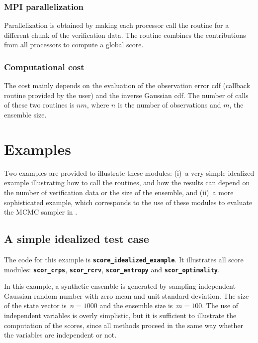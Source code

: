 \documentclass[11pt]{article}
\begin{document}
\subsubsection*{MPI parallelization}

Parallelization is obtained by making each processor call the routine
for a different chunk of the verification data.
The routine combines the contributions from all processors
to compute a global score.

\subsubsection*{Computational cost}

The cost mainly depends on the evaluation of the observation error cdf
(callback routine provided by the user) and the inverse Gaussian cdf.
The number of calls of these two routines is $n m$,
where $n$ is the number of observations and $m$, the ensemble size.

\clearpage

\section{Examples}

Two examples are provided to illustrate these modules:
(i)~a very simple idealized example illustrating how to call the routines,
and how the results can depend on the number of verification data or the size of the ensemble, and
(ii)~a more sophisticated example, which corresponds to the use of these modules
to evaluate the MCMC sampler in \citet{BRAN19}.

\subsection{A simple idealized test case}

The code for this example is {\tt\bf score\_idealized\_example}.
It illustrates all score modules: {\tt\bf scor\_crps}, {\tt\bf scor\_rcrv},
{\tt\bf scor\_entropy} and {\tt\bf scor\_optimality}.

In this example, a synthetic ensemble is generated
by sampling independent Gaussian random number
with zero mean and unit standard deviation.
The size of the state vector is~$n=1000$ and the ensemble size is~$m=100$.
The use of independent variables is overly simplistic,
but it is sufficient to illustrate the computation of the scores,
since all methods proceed in the same way
whether the variables are independent or not.
\end{document}
